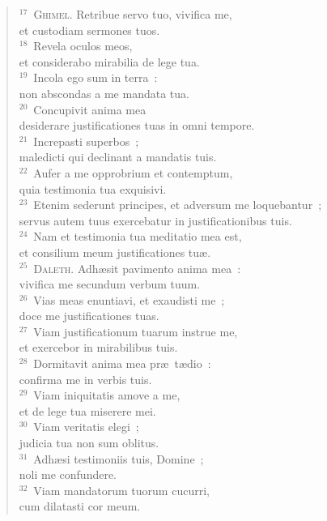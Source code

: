 \begin{flushleft}
\begin{verse}
${}^{17}$~\textsc{Ghimel.} Retribue servo tuo, vivifica me,\\ et custodiam sermones tuos.\\
${}^{18}$~Revela oculos meos,\\ et considerabo mirabilia de lege tua.\\
${}^{19}$~Incola ego sum in terra~:\\ non abscondas a me mandata tua.\\
${}^{20}$~Concupivit anima mea\\ desiderare justificationes tuas in omni tempore.\\
${}^{21}$~Increpasti superbos~;\\ maledicti qui declinant a mandatis tuis.\\
${}^{22}$~Aufer a me opprobrium et contemptum,\\ quia testimonia tua exquisivi.\\
${}^{23}$~Etenim sederunt principes, et adversum me loquebantur~;\\ servus autem tuus exercebatur in justificationibus tuis.\\
${}^{24}$~Nam et testimonia tua meditatio mea est,\\ et consilium meum justificationes tu\ae .\\
${}^{25}$~\textsc{Daleth.} Adh\ae sit pavimento anima mea~:\\ vivifica me secundum verbum tuum.\\
${}^{26}$~Vias meas enuntiavi, et exaudisti me~;\\ doce me justificationes tuas.\\
${}^{27}$~Viam justificationum tuarum instrue me,\\ et exercebor in mirabilibus tuis.\\
${}^{28}$~Dormitavit anima mea pr\ae\ t\ae dio~:\\ confirma me in verbis tuis.\\
${}^{29}$~Viam iniquitatis amove a me,\\ et de lege tua miserere mei.\\
${}^{30}$~Viam veritatis elegi~;\\ judicia tua non sum oblitus.\\
${}^{31}$~Adh\ae si testimoniis tuis, Domine~;\\ noli me confundere.\\
${}^{32}$~Viam mandatorum tuorum cucurri,\\ cum dilatasti cor meum.\\

\end{verse}
\end{flushleft}
